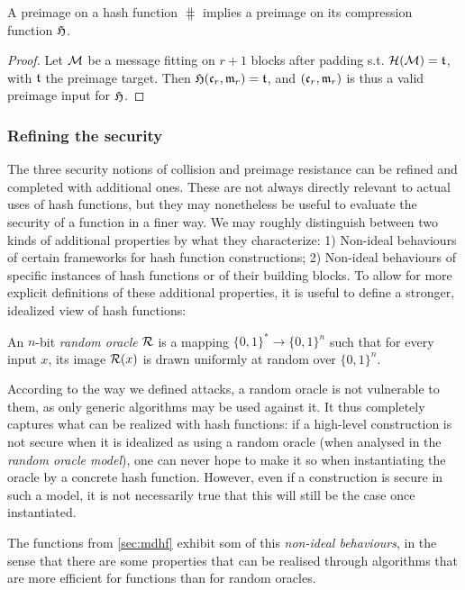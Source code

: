 \begin{prop}
A preimage on a \merkdam hash function $\hash$ implies a preimage on its compression function $\operatorname{\mathfrak{H}}$.
\end{prop}
\begin{proof}
Let $\mathcal{M}$ be a message fitting on $r+1$ blocks after padding s.t. $\operatorname{\mathcal{H}}(\mathcal{M}) = \mathfrak{t}$, with $\mathfrak{t}$ the preimage target.
Then $\operatorname{\mathfrak{H}}(\mathfrak{c}_r, \mathfrak{m}_r) = \mathfrak{t}$, and $(\mathfrak{c}_r, \mathfrak{m}_r)$ is thus a valid preimage input for $\operatorname{\mathfrak{H}}$.
\end{proof}

\subsubsection{Refining the security}
\label{sec:refining_md}

The three security notions of collision and preimage resistance can be refined and completed with additional ones. These are not always directly relevant to actual uses of hash functions, but they may nonetheless be useful to evaluate the security
of a function in a finer way. We may roughly distinguish between two kinds of additional properties by what they characterize: 1) Non-ideal behaviours of certain frameworks for hash function constructions; 2) Non-ideal
behaviours of specific instances of hash functions or of their building blocks.
To allow for more explicit definitions of these additional properties, it is useful to define a stronger, idealized view of hash functions:

\begin{defi}
An $n$-bit \emph{random oracle} $\operatorname{\mathcal{R}}$ is a mapping $\{0,1\}^* \rightarrow \{0,1\}^n$ such that for every input $x$, its image $\operatorname{\mathcal{R}}(x)$ is drawn uniformly at random over $\{0,1\}^n$.
\end{defi}

According to the way we defined attacks, a random oracle is not vulnerable to them, as only generic algorithms may be used against it. It thus completely captures what
can be realized with hash functions: if a high-level construction is not secure when it is idealized as using a random oracle (when analysed in the \emph{random oracle model}),
one can never hope to make it so when instantiating the oracle by a concrete hash function. However, even if a construction is secure in such a model, it is not necessarily true that
this will still be the case once instantiated.

The \merkdam functions from \autoref{sec:mdhf} exhibit som of this \emph{non-ideal behaviours},
in the sense that there are some properties that can be realised through algorithms that are more efficient for \merkdam functions than for random oracles.

